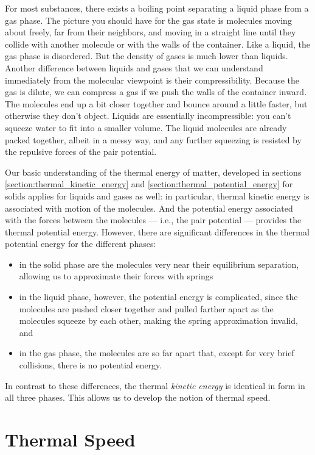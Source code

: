 For most substances, there exists a boiling point separating a liquid
phase from a gas phase.  The picture you should have for the gas state
is molecules moving about freely, far from their neighbors, and moving
in a straight line until they collide with another molecule or with
the walls of the container.  Like a liquid, the gas phase is
disordered.  But the density of gases is much lower than liquids.
Another difference between liquids and gases that we can understand
immediately from the molecular viewpoint is their compressibility.
Because the gas is dilute, we can compress a gas if we push the walls
of the container inward. The molecules end up a bit closer together
and bounce around a little faster, but otherwise they don't object.
Liquids are essentially incompressible: you can't squeeze water to fit
into a smaller volume.  The liquid molecules are already packed
together, albeit in a messy way, and any further squeezing is resisted
by the repulsive forces of the pair potential.

Our basic understanding of the thermal energy of matter, developed
in sections \ref{section:thermal_kinetic_energy} and
\ref{section:thermal_potential_energy} for solids 
applies for liquids and gases as well: in particular, 
thermal kinetic energy is associated with motion of the molecules.
And the potential energy associated with
the forces between the molecules --- i.e., the pair potential ---
provides the thermal potential energy.
However, there are significant differences in the thermal
potential energy for the different phases:
\begin{itemize}
\item in the solid phase are the molecules very near their equilibrium
  separation, allowing us to approximate their forces with springs
\item in the liquid phase, however, the potential energy is
  complicated, since the molecules are pushed closer together and
  pulled farther apart as the molecules squeeze by each other, making
  the spring approximation invalid, and
\item in the gas phase, the molecules are so far apart that, except for
  very brief collisions, there is no potential energy.
\end{itemize}

In contrast to these differences, the thermal {\it kinetic energy\/}
is identical in form in all three phases.  This allows us to develop the
notion of thermal speed.

\section{Thermal Speed}

